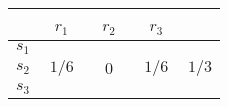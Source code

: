 \documentclass[10pt]{standalone}
\begin{document}
 \begin{tabular}{c|c|c|c|c} \setlength\tabcolsep{0.4cm} 
        & \, $r_1$ \, &  \, $r_2$ \, & \, $r_3$ \, & \\ \hline 
  $s_1$ &  &  & & \\ \hline
  $s_2$ & $1/6$ & $0$ & $1/6$ & $1/3$ \\ \hline
  $s_3$ &  &  &  & \\ \hline 
  \end{tabular}
  \phantom{sssssss}
\end{document}
